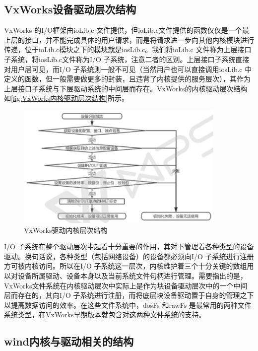 \subsection{VxWorks设备驱动层次结构}
	
	VxWorks 的I/O框架由ioLib.c 文件提供，但ioLib.c文件提供的函数仅仅是一个最上层的接口，并不能完成具体的用户请求，而是将请求进一步向其他内核模块进行传递，位于ioLib.c模块之下的模块就是iosLib.c。我们将ioLib.c 文件称为上层接口子系统，将iosLib.c文件称为I/O 子系统，注意二者的区别。上层接口子系统直接对用户层可见，而I/O 子系统则一般不可见（当然用户也可以直接调用iosLib.c 中定义的函数，但一般需要做更多的封装，且违背了内核提供的服务层次），其作为上层接口子系统与下层驱动系统的中间层而存在。VxWorks的内核驱动层次结构如\autoref{fig:VxWorks内核驱动层次结构}所示。

\begin{figure}[!h]
\centering
\includegraphics[width=0.9\textwidth]{./graphics/vxworks-kernel-diagram.pdf}
\caption{VxWorks驱动内核层次结构}\label{fig:VxWorks内核驱动层次结构}
\end{figure}
	
	I/O 子系统在整个驱动层次中起着十分重要的作用，其对下管理着各种类型的设备驱动。换句话说，各种类型（包括网络设备）的设备都必须向I/O 子系统进行注册方可被内核访问。所以在I/O 子系统这一层次，内核维护着三个十分关键的数组用以对设备所属驱动、设备本身以及当前系统文件句柄进行管理。需要指出的是，VxWorks文件系统在内核驱动层次中实际上是作为块设备驱动层次中的一个中间层而存在的，其向I/O 子系统进行注册，而将底层块设备驱动置于自身的管理之下以提高数据访问的效率。在这些文件系统中，dosFs 和rawFs 是最常用的两种文件系统类型，在VxWorks早期版本就包含对这两种文件系统的支持。
	
\subsection{wind内核与驱动相关的结构}
